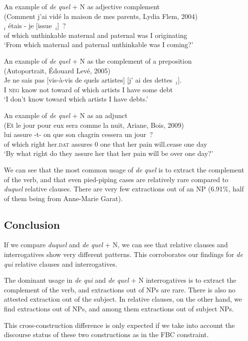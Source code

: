 \ea An example of \emph{de quel} + N as adjective complement\\
(Comment j'ai vidé la maison de mes parents, Lydia Flem, 2004)\\
$_i$ étais - je [issue~\trace{}$_i$]~?\\
of which unthinkable maternal and paternal was {} I originating\\
\glt `From which maternal and paternal unthinkable was I coming?'
\label{ex:deq-adjective-qu}
\z 

\ea An example of \emph{de quel} + N as the complement of a preposition\\
(Autoportrait, Édouard Levé, 2005)\\
\gll Je ne sais pas [vis-à-vis de quels artistes] [j' ai des dettes~\trace{}$_i$].\\
I \textsc{neg} know not toward of which artists I have some debt\\
\glt `I don't know toward which artists I have debts.'
\label{ex:deq-adjective-prep}
\z 

\ea An example of \emph{de quel} + N as an adjunct\nopagebreak\\
(Et le jour pour eux sera comme la nuit, Ariane, Bois, 2009)\nopagebreak\\
 lui assure -t- on que son chagrin cessera un jour~?\\
of which right her\textsc{.dat} assures 0 one that her pain will.cease one day\\
\glt `By what right do they assure her that her pain will be over one day?'
\label{ex:deq-adjective-adjunct}
\z 

We can see that the most common usage of \textit{de quel} is to extract the complement of the verb, and that even pied-piping cases are relatively rare compared to \emph{duquel} relative clauses. There are very few extractions out of an NP (6.91\%, half of them being from Anne-Marie Garat). 

\subsection{Conclusion}

If we compare \emph{duquel} and \emph{de quel} + N, we can see that relative clauses and interrogatives show very different patterns. This corroborates our findings for \emph{de qui} relative clauses and interrogatives.

The dominant usage in \emph{de qui} and \emph{de quel} + N interrogatives is to extract the complement of the verb, and extractions out of NPs are rare. There is also no attested extraction out of the subject.
In relative clauses, on the other hand, we find extractions out of NPs, and among them extractions out of subject NPs.

This cross-construction difference is only expected if we take into account the discourse status of these two constructions as in the FBC constraint. 
